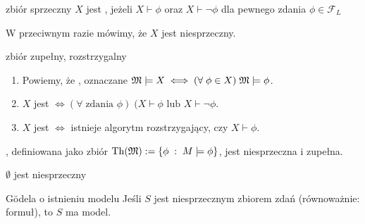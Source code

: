 \begin{definition}{zbiór sprzeczny}{}
  $X$ jest , jeżeli $X\vdash\phi$ oraz $X\vdash\neg\phi$ dla pewnego zdania $\phi\in\mathcal{F}_L$
\end{definition}

W przeciwnym razie mówimy, że $X$ jest niesprzeczny.

\begin{definition}{zbiór zupełny, rozstrzygalny}{}
  \begin{enumerate}
    \item Powiemy, że , oznaczane $\mathfrak{M}\models X\iff (\forall\;\phi\in X)\;\mathfrak{M}\models\phi$.
    \item $X$ jest  $\iff (\forall\;\text{zdania }\phi)\;(X\vdash \phi\text{ lub } X\vdash \neg\phi$.
    \item $X$ jest  $\iff$ istnieje algorytm rozstrzygający, czy $X\vdash\phi$. 
  \end{enumerate}
\end{definition}

\begin{example}[m]
\item {}, definiowana jako zbiór $\operatorname{Th}(\mathfrak{M}):=\{\phi\;:\;M\models\phi\}$, jest niesprzeczna i zupełna.
\item $\emptyset$ jest niesprzeczny
\end{example}

\begin{theorem}{G\"odela o istnieniu modelu}{}
  Jeśli $S$ jest niesprzecznym zbiorem zdań (równoważnie: formuł), to $S$ ma model.
\end{theorem}

